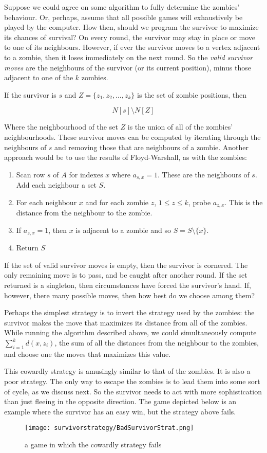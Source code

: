 
Suppose we could agree on some algorithm to fully determine the zombies' behaviour.
Or, perhaps, assume that all possible games will exhaustively be played by the computer.
How then, should we program the survivor to maximize its chances of survival?
On every round, the survivor may stay in place or move to one of its neighbours.
However, if ever the survivor moves to a vertex adjacent to a zombie, then it loses immediately on the next round.
So the \textit{valid survivor moves} are the neighbours of the survivor (or its current position), minus those adjacent to one of the $k$ zombies.

If the survivor is $s$ and $Z = \{z_1, z_2, \dots, z_k\}$ is the set of zombie positions, then

\[N[s]\setminus N[Z]\]

Where the neighbourhood of the set $Z$ is the union of all of the zombies' neighbourhoods.
These survivor moves can be computed by iterating through the neighbours of $s$ and removing those that are neighbours of a zombie.
Another approach would be to use the results of Floyd-Warshall, as with the zombies:

\begin{enumerate}
\item Scan row $s$ of $A$ for indexes $x$ where $a_{s,x} = 1$. These are the neighbours of $s$. Add each neighbour a set $S$.
\item For each neighbour $x$ and for each zombie $z$, $1 \leq z \leq k$, probe $a_{z,x}$. This is the distance from the neighbour to the zombie.
\item If $a_{z,x} = 1$, then $x$ is adjacent to a zombie and so $S = S \setminus \{x\}$.
\item Return $S$
\end{enumerate}

If the set of valid survivor moves is empty, then the survivor is cornered. The only remaining move is to pass, and be caught after another round.
If the set returned is a singleton, then circumstances have forced the survivor's hand.
If, however, there many possible moves, then how best do we choose among them?

Perhaps the simplest strategy is to invert the strategy used by the zombies: the survivor makes the move that maximizes its distance from all of the zombies.
While running the algorithm described above, we could simultaneously compute $\sum_{i=1}^{k} d(x, z_i)$, the sum of all the distances from the neighbour to the
zombies, and choose one the moves that maximizes this value.

This cowardly strategy is amusingly similar to that of the zombies. It is also a poor strategy. The only way to escape the zombies is to lead them into some sort of cycle,
as we discuss next. So the survivor needs to act with more sophistication than just fleeing in the opposite direction. The game depicted below is an example
where the survivor has an easy win, but the strategy above fails.

\begin{figure}[h!]
\centering
\texttt{[image: survivorstrategy/BadSurvivorStrat.png]}
\caption{a game in which the cowardly strategy fails} \label{fig:BadSurvivorStrat}
\end{figure}
